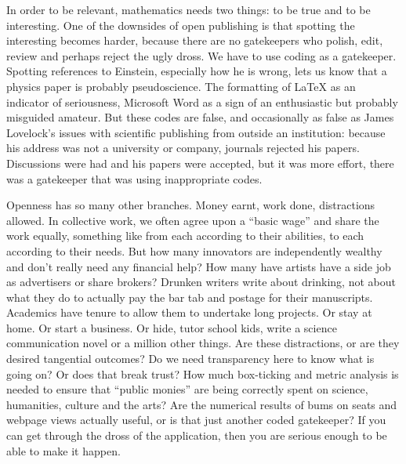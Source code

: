 In order to be relevant, mathematics needs two things: to be true and to
be interesting. One of the downsides of open publishing is that spotting
the interesting becomes harder, because there are no gatekeepers who
polish, edit, review and perhaps reject the ugly dross. We have to use
coding as a gatekeeper. Spotting references to Einstein, especially how
he is wrong, lets us know that a physics paper is probably
pseudoscience. The formatting of LaTeX as an indicator of seriousness,
Microsoft Word as a sign of an enthusiastic but probably misguided
amateur. But these codes are false, and occasionally as false as James
Lovelock's issues with scientific publishing from outside an
institution: because his address was not a university or company,
journals rejected his papers. Discussions were had and his papers were
accepted, but it was more effort, there was a gatekeeper that was using
inappropriate codes.

Openness has so many other branches. Money earnt, work done,
distractions allowed. In collective work, we often agree upon a ``basic
wage'' and share the work equally, something like from each according to
their abilities, to each according to their needs. But how many
innovators are independently wealthy and don't really need any financial
help? How many have artists have a side job as advertisers or share
brokers? Drunken writers write about drinking, not about what they do to
actually pay the bar tab and postage for their manuscripts. Academics
have tenure to allow them to undertake long projects. Or stay at home.
Or start a business. Or hide, tutor school kids, write a science
communication novel or a million other things. Are these distractions,
or are they desired tangential outcomes? Do we need transparency here to
know what is going on? Or does that break trust? How much box-ticking
and metric analysis is needed to ensure that ``public monies'' are being
correctly spent on science, humanities, culture and the arts? Are the
numerical results of bums on seats and webpage views actually useful, or
is that just another coded gatekeeper? If you can get through the dross
of the application, then you are serious enough to be able to make it
happen.

